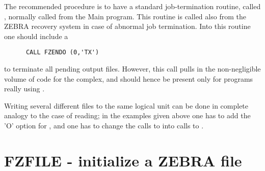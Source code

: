 The recommended procedure is to have a standard job-termination
routine, called ,
normally called from the Main program.
This routine is called also from the ZEBRA recovery system in case
of abnormal job termination.
Into this routine one should include a
\begin{verbatim}
      CALL FZENDO (0,'TX')
\end{verbatim}
to terminate all pending output files.
However, this call pulls in the non-negligible volume of code
for the  complex, and should hence be present only
for programs really using .

Writing several different files to the same logical unit
can be done in complete analogy to the case of reading;
in the examples given above one has to add the 'O' option
for ,
and one has to change the calls to  into calls to .

\section{FZFILE - initialize a ZEBRA file}
\label{sec:FZFILE}

